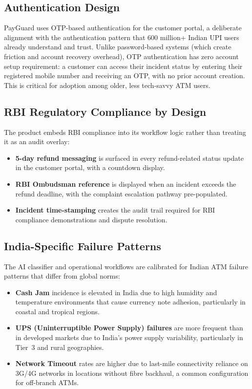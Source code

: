 \documentclass[12pt,a4paper]{article}
\begin{document}
\subsection{Authentication Design}

PayGuard uses OTP-based authentication for the customer portal, a deliberate alignment with
the authentication pattern that 600 million+ Indian UPI users already understand and trust.
Unlike password-based systems (which create friction and account recovery overhead), OTP
authentication has zero account setup requirement: a customer can access their incident
status by entering their registered mobile number and receiving an OTP, with no prior account
creation. This is critical for adoption among older, less tech-savvy ATM users.

\subsection{RBI Regulatory Compliance by Design}

The product embeds RBI compliance into its workflow logic rather than treating it as an
audit overlay:
\begin{itemize}
  \item \textbf{5-day refund messaging} is surfaced in every refund-related status update
        in the customer portal, with a countdown display.
  \item \textbf{RBI Ombudsman reference} is displayed when an incident exceeds the refund
        deadline, with the complaint escalation pathway pre-populated.
  \item \textbf{Incident time-stamping} creates the audit trail required for RBI compliance
        demonstrations and dispute resolution.
\end{itemize}

\subsection{India-Specific Failure Patterns}

The AI classifier and operational workflows are calibrated for Indian ATM failure patterns
that differ from global norms:
\begin{itemize}
  \item \textbf{Cash Jam} incidence is elevated in India due to high humidity and temperature
        environments that cause currency note adhesion, particularly in coastal and
        tropical regions.
  \item \textbf{UPS (Uninterruptible Power Supply) failures} are more frequent than in
        developed markets due to India's power supply variability, particularly in Tier~3
        and rural geographies.
  \item \textbf{Network Timeout} rates are higher due to last-mile connectivity reliance on
        3G/4G networks in locations without fibre backhaul, a common configuration for
        off-branch ATMs.
\end{itemize}
\end{document}
